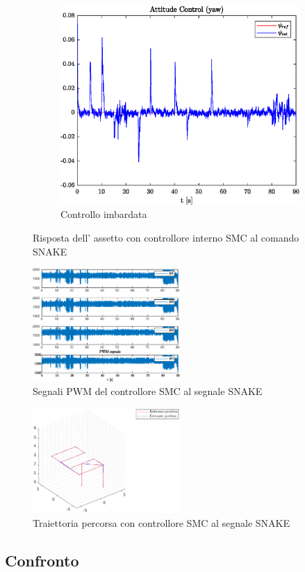 \begin{figure}
\begin{subfigure}{0.45\textwidth}
	\end{subfigure}
	\hfill
	\begin{subfigure}{0.45\textwidth}
		\centering
		\includegraphics[width=1\textwidth]{Simulazioni/Figure/SMC/SNAKE/AttitudeControlYaw}
		\caption{Controllo imbardata}
	\end{subfigure}
	\caption{Risposta dell' assetto con controllore interno SMC al comando SNAKE}
\end{figure}


\begin{figure}
	\centering
	\includegraphics[width=0.5\textwidth]{Simulazioni/Figure/SMC/SNAKE/PWM}
	\caption{Segnali PWM del controllore SMC al segnale SNAKE}
\end{figure}
\begin{figure}
	\centering
	\includegraphics[width=0.5\textwidth]{Simulazioni/Figure/SMC/SNAKE/Trajectory}
	\caption{Traiettoria percorsa con controllore SMC al segnale SNAKE}
\end{figure}

\clearpage
\subsection{Confronto}
